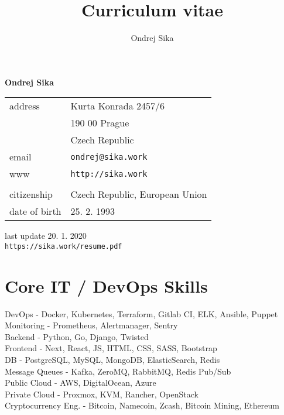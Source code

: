 \documentclass[12pt,a4paper]{article}
\title{Curriculum vitae}
\author{Ondrej Sika}
\begin{document}
\begin{center}
{\LARGE \bf Ondrej Sika}\\
\vspace*{0.2cm}
\begin{tabular}{R{7cm}L{7cm}}
address & Kurta Konrada 2457/6\\
 & 190 00 Prague\\
 & Czech Republic\\
email & \texttt{ondrej@sika.work}\\
www & \texttt{http://sika.work}\\
\\
citizenship & Czech Republic, European Union\\
date of birth & 25. 2. 1993\\
\end{tabular}

\vspace*{0.3cm}
{\hfill last update 20. 1. 2020}\\
{\hfill \texttt{https://sika.work/resume.pdf}}
\end{center}

\section*{Core IT / DevOps Skills}
DevOps - Docker, Kubernetes, Terraform, Gitlab CI, ELK, Ansible, Puppet\\
Monitoring - Prometheus, Alertmanager, Sentry\\
Backend - Python, Go, Django, Twisted\\
Frontend - Next, React, JS, HTML, CSS, SASS, Bootstrap\\
DB - PostgreSQL, MySQL, MongoDB, ElasticSearch, Redis\\
Message Queues - Kafka, ZeroMQ, RabbitMQ, Redis Pub/Sub\\
Public Cloud - AWS, DigitalOcean, Azure\\
Private Cloud - Proxmox, KVM, Rancher, OpenStack\\
Cryptocurrency Eng. - Bitcoin, Namecoin, Zcash, Bitcoin Mining, Ethereum\\
\end{document}
